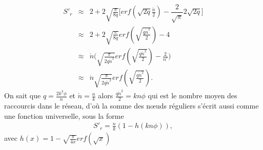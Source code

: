 \begin{eqnarray}
S'_r&\approx&2+ 2\sqrt{\frac{\pi}{8q}}\Big[erf(\sqrt{2q}\frac{\acute{n}}{2})-\dfrac{2}{\sqrt{\pi}}2\sqrt{2q}\Big] \\\nonumber
&\approx& 2+2\sqrt{\frac{\pi}{8q}}erf(\sqrt{\frac{q\acute{n}^2}{2}})-4  \\\nonumber
&\approx& \acute{n}\Big(\sqrt{\frac{\pi}{2q\acute{n}^2}}erf(\sqrt{\frac{q\acute{n}^2}{2}})-\frac{2}{n'}\Big)  \\\nonumber
&\approx& \acute{n}\sqrt{\frac{\pi}{2q\acute{n}^2}}erf(\sqrt{\frac{q\acute{n}^2}{2}}).\nonumber
\end{eqnarray}
On sait que $q=\frac{2k^3\phi}{n}$ et $\acute{n}=\frac{n}{k}$ alors $\frac{q\acute{n}^2}{2}=kn\phi$ qui est le
nombre moyen des raccourcis dans le réseau, d'où  la somme des nœuds réguliers s'écrit aussi comme une
fonction universelle, sous la forme
\begin{eqnarray}
S'_r=\frac{n}{k}(1-h(kn\phi)),
\end{eqnarray}
avec $h(x)=1-\sqrt{\frac{\pi}{4x}}erf(\sqrt{x})$\\

